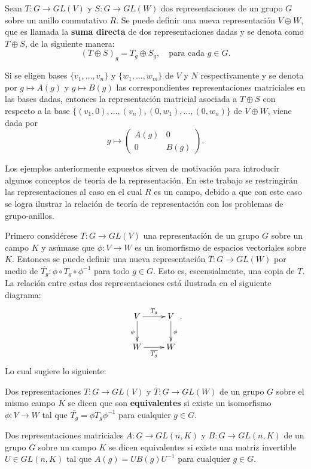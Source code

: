 \begin{ejemplo}
Sean $T \colon G \to GL(V)$ y $S \colon G \to GL(W)$ dos representaciones de un grupo $G$ sobre un anillo conmutativo $R$. Se puede definir una nueva representación $V \oplus W$, que es llamada la \textbf{suma directa} de dos representaciones dadas y se denota como $T \oplus S$, de la siguiente manera: \[ (T \oplus S)_g = T_g \oplus S_g, \quad \mbox{para cada } g \in G. \]

Si se eligen bases $\{v_1, \dots, v_n\}$ y $\{ w_1, \dots, w_m \}$ de $V$ y $N$ respectivamente y se denota por $g \mapsto A(g)$ y $g \mapsto B(g)$ las correspondientes representaciones matriciales en las bases dadas, entonces la representación matricial asociada a $T \oplus S$ con respecto a la base $\{ (v_1,0), \dots , (v_n), (0,w_1), \dots, (0,w_n)  \}$ de $V \oplus W$, viene dada por
\[ g \mapsto \begin{pmatrix}
A(g) & 0 \\
0 & B(g)
\end{pmatrix}. \]

\end{ejemplo}

Los ejemplos anteriormente expuestos sirven de motivación para introducir algunos conceptos de teoría de la representación. En este trabajo se restringirán las representaciones al caso en el cual $R$ es un campo, debido a que con este caso se logra ilustrar la relación de teoría de representación con los problemas de grupo-anillos.

Primero considérese $T \colon G \to GL(V)$ una representación de un grupo $G$ sobre un campo $K$ y asúmase que $\phi \colon V \to W$ es un isomorfismo de espacios vectoriales sobre $K$. Entonces se puede definir una nueva representación $\overline{T} \colon G \to GL(W)$ por medio de $\overline{T_g} \colon \phi \circ T_g \circ \phi^{-1}$ para todo $g \in G$. Esto es, escensialmente, una copia de $T$. La relación entre estas dos representaciones está ilustrada en el siguiente diagrama:
\[\xymatrix { V \ar[r]^{T_g} 
\ar[d]_{\phi}
 & V \ar[d]^{\phi} \\
W \ar[r]_{\overline{T_g}} & W}.\]
Lo cual sugiere lo siguiente:
\begin{definicion}
Dos representaciones $T \colon G \to GL(V)$ y $\overline{T} \colon G \to GL(W)$ de un grupo $G$ sobre el mismo campo $K$ se dicen que son \textbf{equivalentes} si existe un isomorfismo $\phi \colon V \to W$ tal que $\overline{T_g} = \phi T_g \phi^{-1} $ para cualquier $g \in G$.
\end{definicion}
\begin{definicion}
Dos representaciones matriciales $A \colon G \to GL(n,K)$ y $B \colon G \to GL(n,K)$ de un grupo $G$ sobre un campo $K$ se dicen equivalentes si existe una matriz invertible $U \in GL(n,K)$ tal que $A(g) = UB(g)U^{-1}$ para cualquier $g \in G$.
\end{definicion}

